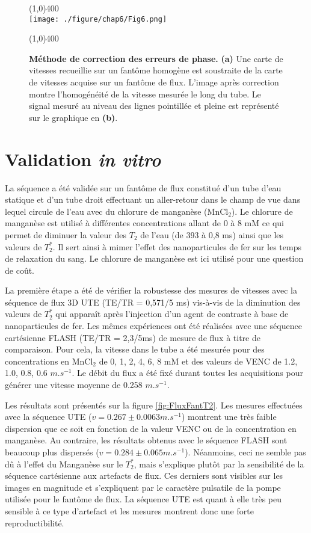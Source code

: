 \begin{figure}[H]
\centering
\line(1,0){400} \\
\texttt{[image: ./figure/chap6/Fig6.png]}
\caption[Correction de la phase.]{\label{fig:CorrectionPhase} \textbf{Méthode de correction des erreurs de phase.} \textbf{(a)} 
Une carte de vitesses recueillie sur un fantôme homogène est soustraite de la carte de vitesses acquise sur un fantôme de flux. L’image après correction montre l’homogénéité de la vitesse mesurée le long du tube. Le signal mesuré au niveau des lignes pointillée et pleine est représenté sur le graphique en \textbf{(b)}.}
\line(1,0){400} \\ 
\end{figure}

\section{Validation \textit{in vitro}}

La séquence a été validée sur un fantôme de flux constitué d'un tube d'eau statique et d'un tube droit effectuant un aller-retour dans le champ de vue dans lequel circule de l'eau avec du chlorure de manganèse ($\text{MnCl}_2$). Le chlorure de manganèse est utilisé à différentes concentrations allant de 0 à 8 mM ce qui permet de diminuer la valeur des $T_2$ de l'eau (de 393 à 0,8 ms) ainsi que les valeurs de $T_2^*$. Il sert ainsi à mimer l'effet des nanoparticules de fer sur les temps de relaxation du sang. Le chlorure de manganèse est ici utilisé pour une question de coût.

La première étape a été de vérifier la robustesse des mesures de vitesses avec la séquence de flux 3D UTE (TE/TR = 0,571/5 ms) vis-à-vis de la diminution des valeurs de $T_2^*$ qui apparaît après l'injection d'un agent de contraste à base de nanoparticules de fer. Les mêmes expériences ont été réalisées avec une séquence cartésienne FLASH (TE/TR = 2,3/5ms) de mesure de flux à titre de comparaison.
Pour cela, la vitesse dans le tube a été mesurée pour des concentrations en $\text{MnCl}_2$ de 0, 1, 2, 4, 6, 8 mM et des valeurs de VENC de 1.2, 1.0, 0.8, 0.6 $m.s^{-1}$. Le débit du flux a été fixé durant toutes les acquisitions pour générer une vitesse moyenne de 0.258 $m.s^{-1}$.

Les résultats sont présentés sur la figure \ref{fig:FluxFantT2}. Les mesures effectuées avec la séquence UTE ($v=0.267 \pm 0.0063 m.s^{-1}$) montrent une très faible dispersion que ce soit en fonction de la valeur VENC ou de la concentration en manganèse. Au contraire, les résultats obtenus avec le séquence FLASH sont beaucoup plus dispersés ($v=0.284 \pm 0.065 m.s^{-1}$). 
Néanmoins, ceci ne semble pas dû à l'effet du Manganèse sur le $T_2^*$, mais s’explique plutôt par la sensibilité de la séquence cartésienne aux artefacts de flux. Ces derniers sont visibles sur les images en magnitude et s’expliquent par le caractère pulsatile de la pompe utilisée pour le fantôme de flux. La séquence UTE est quant à elle très peu sensible à ce type d’artefact et les mesures montrent donc une forte reproductibilité. 

